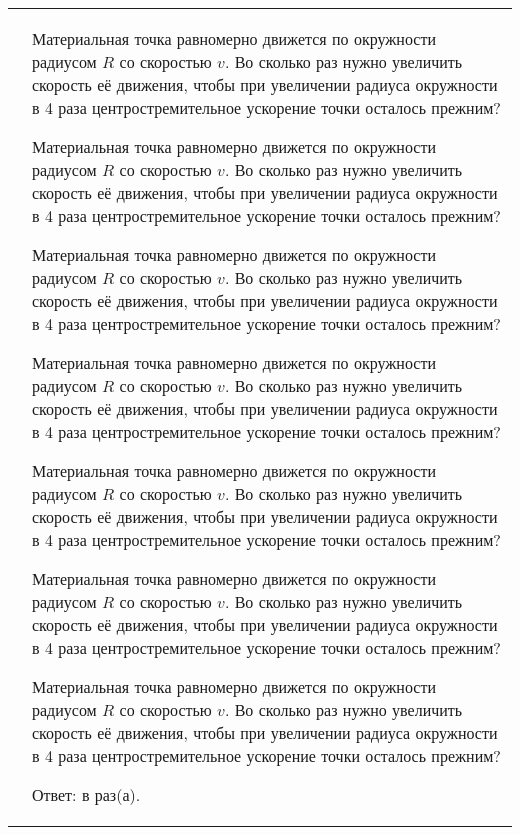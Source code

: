 \documentclass[10pt,a4paper,twocolumn,landscape]{article}
\begin{document}
\hspace{-1.5cm}
\begin{tabular}{c l}
	\framebox[0.85cm]{\textbf{1}}\hspace{-0.15cm} &
	\begin{minipage}[t]{11.25cm}
		Материальная точка равномерно движется по окружности радиусом $R$
		со скоростью $v$. Во сколько раз нужно увеличить скорость её движения,
		чтобы при увеличении радиуса окружности в 4 раза центростремительное
		ускорение точки осталось прежним?

		Материальная точка равномерно движется по окружности радиусом $R$
		со скоростью $v$. Во сколько раз нужно увеличить скорость её движения,
		чтобы при увеличении радиуса окружности в 4 раза центростремительное
		ускорение точки осталось прежним?

		Материальная точка равномерно движется по окружности радиусом $R$
		со скоростью $v$. Во сколько раз нужно увеличить скорость её движения,
		чтобы при увеличении радиуса окружности в 4 раза центростремительное
		ускорение точки осталось прежним?

		Материальная точка равномерно движется по окружности радиусом $R$
		со скоростью $v$. Во сколько раз нужно увеличить скорость её движения,
		чтобы при увеличении радиуса окружности в 4 раза центростремительное
		ускорение точки осталось прежним?

		Материальная точка равномерно движется по окружности радиусом $R$
		со скоростью $v$. Во сколько раз нужно увеличить скорость её движения,
		чтобы при увеличении радиуса окружности в 4 раза центростремительное
		ускорение точки осталось прежним?

		Материальная точка равномерно движется по окружности радиусом $R$
		со скоростью $v$. Во сколько раз нужно увеличить скорость её движения,
		чтобы при увеличении радиуса окружности в 4 раза центростремительное
		ускорение точки осталось прежним?
		
		Материальная точка равномерно движется по окружности радиусом $R$
		со скоростью $v$. Во сколько раз нужно увеличить скорость её движения,
		чтобы при увеличении радиуса окружности в 4 раза центростремительное
		ускорение точки осталось прежним?

		\vspace{1em}Ответ: в \underline{\hspace{4.5cm}} раз(а).
	\end{minipage}
\end{tabular}


\end{document}
